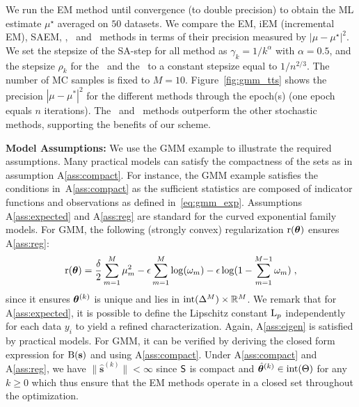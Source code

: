 \documentclass[12pt]{article}
\begin{document}
We run the EM method until convergence (to double precision) to obtain the ML estimate $\mu^\star$ averaged on $50$ datasets. 
We compare the EM, iEM (incremental EM), SAEM, \ISAEM, \SAEMVR\ and \FISAEM\ methods in terms of their precision measured by $| \mu - \mu^\star |^2$. 
We set the stepsize of the {SA-step} for all method as $\gamma_k = 1/k^{\alpha}$ with $\alpha = 0.5$, and the stepsize $\rho_k$ for the \SAEMVR\ and the \FISAEM\ to a constant stepsize equal to $1/n^{2/3}$. 
The number of MC samples is fixed to $M=10$.
Figure~\ref{fig:gmm_tts} shows the precision $|\mu - \mu^*|^2$ for the different methods through the epoch(s) (one epoch equals $n$ iterations). 
The \SAEMVR\ and \FISAEM\ methods outperform the other stochastic methods, supporting the benefits of our scheme.

\vspace{0.1in}

\noindent \textbf{Model Assumptions:}
We use the GMM example to illustrate the required assumptions.
Many practical models can satisfy the compactness of the sets as in assumption A\ref{ass:compact}. 
For instance, the GMM example satisfies the conditions in~A\ref{ass:compact} as the sufficient statistics are composed of indicator functions and observations as defined in~\eqref{eq:gmm_exp}.
Assumptions A\ref{ass:expected} and A\ref{ass:reg} are standard for the curved exponential family models.
For GMM, the following (strongly convex) regularization $\operatorname{r}( {\bm{\theta}} )$ ensures A\ref{ass:reg}:
$$
\operatorname{r}( {\bm{\theta}} ) = \frac{\delta}{2} \sum_{m=1}^M \mu_m^2 - \epsilon \sum_{m=1}^M  \log ( \omega_m )  - \epsilon \log ( 1 - \sum_{m=1}^{M-1} \omega_m ) \;,
$$
since it ensures ${\bm{\theta}}^{(k)}$ is unique and lies in ${\rm int}( \Delta^M ) \times \mathbb{R}^M$.
We remark that for A\ref{ass:expected}, it is possible to define the Lipschitz constant $\operatorname{L}_{p}$ independently for each data $y_i$ to yield a refined characterization. 
Again, A\ref{ass:eigen} is satisfied by practical models. For GMM, it can be verified by deriving the closed form expression for $\operatorname{B}( {\mathbf{s}} )$ and using A\ref{ass:compact}.
Under A\ref{ass:compact} and A\ref{ass:reg}, we have $\| \hat{\bm s}^{(k)} \| < \infty$ since $\mathsf{S}$ is compact and $\hat{{\bm{\theta}}}^{(k)} \in {\rm int}( \Theta )$ for any $k \geq 0$ which thus ensure that the EM methods operate in a closed set throughout the optimization.


\vspace{0.1in}
\end{document}
